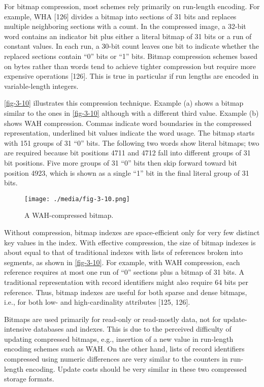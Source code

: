 For bitmap compression, most schemes rely primarily on run-length
encoding. For example, WHA {[}126{]} divides a bitmap into sections of
31 bits and replaces multiple neighboring sections with a count. In the
compressed image, a 32-bit word contains an indicator bit plus either a
literal bitmap of 31 bits or a run of constant values. In each run, a
30-bit count leaves one bit to indicate whether the replaced sections
contain ``0'' bits or ``1'' bits. Bitmap compression schemes based on
bytes rather than words tend to achieve tighter compression but require
more expensive operations {[}126{]}. This is true in particular if run
lengths are encoded in variable-length integers.

\autoref{fig-3-10} illustrates this compression technique. Example (a) shows a
bitmap similar to the ones in \autoref{fig-3-10} although with a different
third value. Example (b) shows WAH compression. Commas indicate word
boundaries in the compressed representation, underlined bit values
indicate the word usage. The bitmap starts with 151 groups of 31 ``0''
bits. The following two words show literal bitmaps; two are required
because bit positions 4711 and 4712 fall into different groups of 31 bit
positions. Five more groups of 31 ``0'' bits then skip forward toward
bit position 4923, which is shown as a single ``1'' bit in the final
literal group of 31 bits.

\begin{figure}
  \centering
  \texttt{[image: ./media/fig-3-10.png]}

  \caption{A WAH-compressed bitmap.\label{fig-3-10}}
\end{figure}

Without compression, bitmap indexes are space-efficient only for very
few distinct key values in the index. With effective compression, the
size of bitmap indexes is about equal to that of traditional indexes
with lists of references broken into segments, as shown in \autoref{fig-3-10}.
For example, with WAH compression, each reference requires at most one
run of ``0'' sections plus a bitmap of 31 bits. A traditional
representation with record identifiers might also require 64 bits per
reference. Thus, bitmap indexes are useful for both sparse and dense
bitmaps, i.e., for both low- and high-cardinality attributes {[}125,
126{]}.

Bitmaps are used primarily for read-only or read-mostly data, not for
update-intensive databases and indexes. This is due to the perceived
difficulty of updating compressed bitmaps, e.g., insertion of a new
value in run-length encoding schemes such as WAH. On the other hand,
lists of record identifiers compressed using numeric differences are
very similar to the counters in run-length encoding. Update costs should
be very similar in these two compressed storage formats.

